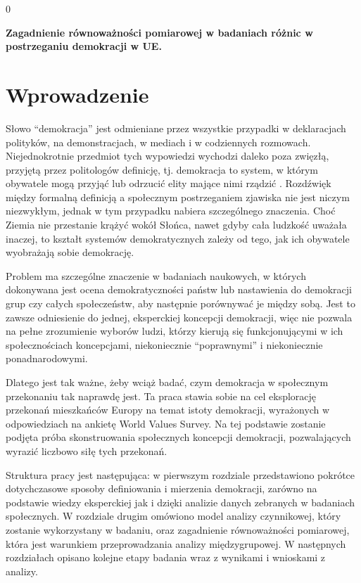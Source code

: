 \documentclass[12pt]{article}
\newcommand{\blind}{0}
\begin{document}
\blind
{
  \bigskip
  \bigskip
  \bigskip
  \begin{center}
    {\LARGE\bf Zagadnienie równoważności pomiarowej w badaniach różnic w postrzeganiu demokracji w UE.}
  \end{center}
  \medskip
} \fi


\newpage
{} %

\tableofcontents
\listoftables
\listoffigures

\newpage

\hypertarget{wprowadzenie}{%
\section*{Wprowadzenie}\label{wprowadzenie}}

Słowo ``demokracja'' jest odmieniane przez wszystkie przypadki w deklaracjach polityków, na demonstracjach, w mediach i w codziennych rozmowach. Niejednokrotnie przedmiot tych wypowiedzi wychodzi daleko poza zwięzłą, przyjętą przez politologów definicję, tj. demokracja to system, w którym obywatele mogą przyjąć lub odrzucić elity mające nimi rządzić \citep{Schumpeter}. Rozdźwięk między formalną definicją a społecznym postrzeganiem zjawiska nie jest niczym niezwykłym, jednak w tym przypadku nabiera szczególnego znaczenia. Choć Ziemia nie przestanie krążyć wokół Słońca, nawet gdyby cała ludzkość uważała inaczej, to kształt systemów demokratycznych zależy od tego, jak ich obywatele wyobrażają sobie demokrację.

Problem ma szczególne znaczenie w badaniach naukowych, w których dokonywana jest ocena demokratyczności państw lub nastawienia do demokracji grup czy całych społeczeństw, aby następnie porównywać je między sobą. Jest to zawsze odniesienie do jednej, eksperckiej koncepcji demokracji, więc nie pozwala na pełne zrozumienie wyborów ludzi, którzy kierują się funkcjonującymi w ich społecznościach koncepcjami, niekoniecznie ``poprawnymi'' i niekoniecznie ponadnarodowymi.

Dlatego jest tak ważne, żeby wciąż badać, czym demokracja w społecznym przekonaniu tak naprawdę jest. Ta praca stawia sobie na cel eksplorację przekonań mieszkańców Europy na temat istoty demokracji, wyrażonych w odpowiedziach na ankietę World Values Survey. Na tej podstawie zostanie podjęta próba skonstruowania społecznych koncepcji demokracji, pozwalających wyrazić liczbowo siłę tych przekonań.

Struktura pracy jest następująca: w pierwszym rozdziale przedstawiono pokrótce dotychczasowe sposoby definiowania i mierzenia demokracji, zarówno na podstawie wiedzy eksperckiej jak i dzięki analizie danych zebranych w badaniach społecznych. W rozdziale drugim omówiono model analizy czynnikowej, który zostanie wykorzystany w badaniu, oraz zagadnienie równoważności pomiarowej, która jest warunkiem przeprowadzania analizy międzygrupowej. W następnych rozdziałach opisano kolejne etapy badania wraz z wynikami i wnioskami z analizy.
\end{document}
